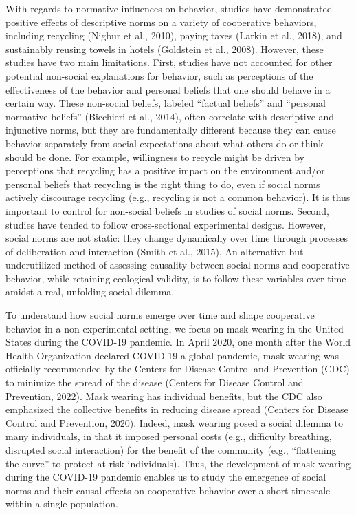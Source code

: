 \documentclass[
  man, donotrepeattitle,mask,floatsintext]{apa6}
\begin{document}
With regards to normative influences on behavior, studies have demonstrated positive effects of descriptive norms on a variety of cooperative behaviors, including recycling (Nigbur et al., 2010), paying taxes (Larkin et al., 2018), and sustainably reusing towels in hotels (Goldstein et al., 2008). However, these studies have two main limitations. First, studies have not accounted for other potential non-social explanations for behavior, such as perceptions of the effectiveness of the behavior and personal beliefs that one should behave in a certain way. These non-social beliefs, labeled ``factual beliefs'' and ``personal normative beliefs'' (Bicchieri et al., 2014), often correlate with descriptive and injunctive norms, but they are fundamentally different because they can cause behavior separately from social expectations about what others do or think should be done. For example, willingness to recycle might be driven by perceptions that recycling has a positive impact on the environment and/or personal beliefs that recycling is the right thing to do, even if social norms actively discourage recycling (e.g., recycling is not a common behavior). It is thus important to control for non-social beliefs in studies of social norms. Second, studies have tended to follow cross-sectional experimental designs. However, social norms are not static: they change dynamically over time through processes of deliberation and interaction (Smith et al., 2015). An alternative but underutilized method of assessing causality between social norms and cooperative behavior, while retaining ecological validity, is to follow these variables over time amidst a real, unfolding social dilemma.

To understand how social norms emerge over time and shape cooperative behavior in a non-experimental setting, we focus on mask wearing in the United States during the COVID-19 pandemic. In April 2020, one month after the World Health Organization declared COVID-19 a global pandemic, mask wearing was officially recommended by the Centers for Disease Control and Prevention (CDC) to minimize the spread of the disease (Centers for Disease Control and Prevention, 2022). Mask wearing has individual benefits, but the CDC also emphasized the collective benefits in reducing disease spread (Centers for Disease Control and Prevention, 2020). Indeed, mask wearing posed a social dilemma to many individuals, in that it imposed personal costs (e.g., difficulty breathing, disrupted social interaction) for the benefit of the community (e.g., ``flattening the curve'' to protect at-risk individuals). Thus, the development of mask wearing during the COVID-19 pandemic enables us to study the emergence of social norms and their causal effects on cooperative behavior over a short timescale within a single population.
\end{document}
